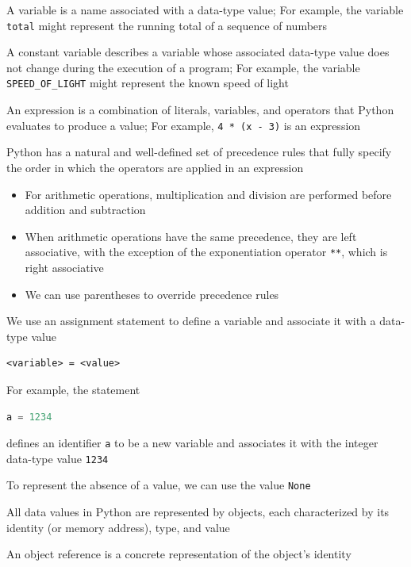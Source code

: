 \documentclass[8pt,a4paper,compress]{beamer}
\begin{document}
\begin{frame}[fragile]
\pause

A variable is a name associated with a data-type value; For example, the variable \lstinline{total} might represent the running total of a sequence of numbers

\pause
\bigskip

A constant variable describes a variable whose associated data-type value does not change during the execution of a program; For example, the variable \lstinline{SPEED_OF_LIGHT} might represent the known speed of light

\pause
\bigskip

An expression is a combination of literals, variables, and operators that Python evaluates to produce a value; For example, \lstinline{4 * (x - 3)} is an expression

\pause
\bigskip

Python has a natural and well-defined set of precedence rules that fully specify the order in which the operators are applied in an expression
\begin{itemize}
\item For arithmetic operations, multiplication and division are performed before addition and subtraction

\item When arithmetic operations have the same precedence, they are left associative, with the exception of the exponentiation operator \lstinline{**}, which is right associative

\item We can use parentheses to override precedence rules
\end{itemize} 
\end{frame}

\begin{frame}[fragile]
\pause

We use an assignment statement to define a variable and associate it with a data-type value
\begin{lstlisting}[language={}]
<variable> = <value>
\end{lstlisting}

\pause
\bigskip

For example, the statement 
\begin{lstlisting}[language=Python]
a = 1234
\end{lstlisting}
defines an identifier \lstinline{a} to be a new variable and associates it with the integer data-type value \lstinline{1234}

\pause
\bigskip

To represent the absence of a value, we can use the value \lstinline{None}

\pause
\bigskip

All data values in Python are represented by objects, each characterized by its identity (or memory address), type, and value

\pause
\bigskip

An object reference is a concrete representation of the object's identity
\end{frame}
\end{document}
